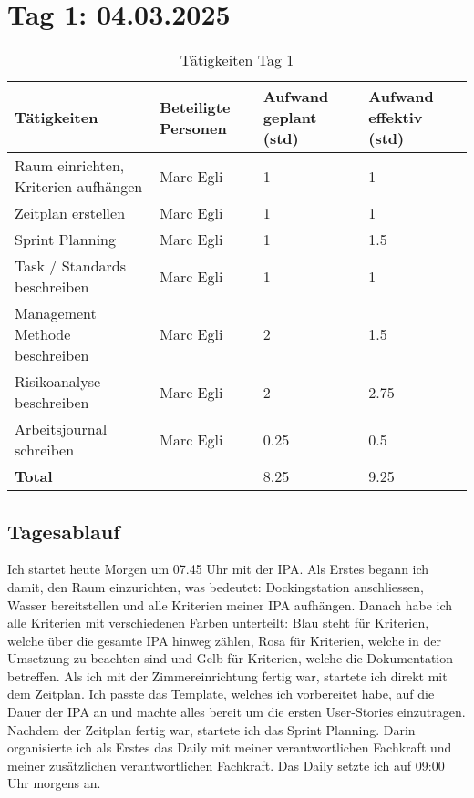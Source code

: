 \section{Tag 1: 04.03.2025}
\begin{table}[H]
    \begin{tabular}{|L{0.4\textwidth}|C{60pt}|C{60pt}|C{60pt}|}
        \hline
        \color{white}Tätigkeiten & \color{white}Beteiligte \color{white}Personen & \color{white}Aufwand geplant (std) & \color{white}Aufwand effektiv (std) \\
        \hline
         Raum einrichten, Kriterien aufhängen & Marc Egli & 1 & 1 \\
        \hline
        Zeitplan erstellen & Marc Egli & 1 & 1 \\
        \hline
        Sprint Planning & Marc Egli & 1 & 1.5 \\
        \hline
        Task / Standards beschreiben & Marc Egli & 1 & 1 \\
        \hline
        Management Methode beschreiben & Marc Egli & 2 & 1.5 \\
        \hline
        Risikoanalyse beschreiben & Marc Egli & 2 & 2.75 \\
        \hline
        Arbeitsjournal schreiben & Marc Egli & 0.25 & 0.5 \\
        \hline
        \textbf{Total} &  & 8.25 & 9.25 \\
        \hline
    \end{tabular}
    \caption{Tätigkeiten Tag 1}
\end{table}

\subsection*{Tagesablauf}
Ich startet heute Morgen um 07.45 Uhr mit der IPA. Als Erstes begann ich damit, den Raum einzurichten, was bedeutet: 
Dockingstation anschliessen, Wasser bereitstellen und alle Kriterien meiner IPA aufhängen. Danach habe ich alle Kriterien mit verschiedenen
Farben unterteilt: Blau steht für Kriterien, welche über die gesamte IPA hinweg zählen, Rosa für Kriterien, welche in der Umsetzung zu beachten sind und 
Gelb für Kriterien, welche die Dokumentation betreffen. Als ich mit der Zimmereinrichtung fertig war, startete ich direkt mit dem Zeitplan. Ich passte das Template,
welches ich vorbereitet habe, auf die Dauer der IPA an und machte alles bereit um die ersten User-Stories einzutragen.  Nachdem der Zeitplan fertig war, startete ich das Sprint Planning.
Darin organisierte ich als Erstes das Daily mit meiner verantwortlichen Fachkraft und meiner zusätzlichen verantwortlichen Fachkraft. Das Daily setzte ich auf
09:00 Uhr morgens an. 

